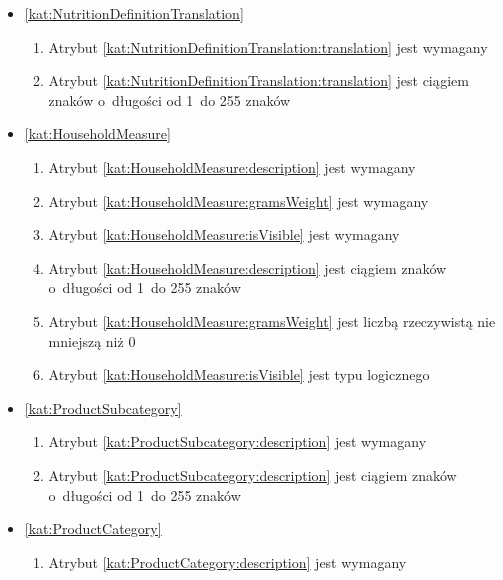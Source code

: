 \begin{itemize}[label={\textbf{Ograniczenia dla}}, wide, labelwidth=!, labelindent=0pt]
    \item\ref{kat:NutritionDefinitionTranslation}\mynobreakpar
    \begin{enumerate}[label={\textbf{OGR/2/\protect\twodigits{\arabic{enumi}}}}, wide, labelwidth=!, align=left, leftmargin=3cm, resume]
        \item Atrybut \ref{kat:NutritionDefinitionTranslation:translation} jest wymagany

        \item Atrybut \ref{kat:NutritionDefinitionTranslation:translation} jest ciągiem znaków o~długości od 1~do 255 znaków
    \end{enumerate}

    \item\ref{kat:HouseholdMeasure}\mynobreakpar
    \begin{enumerate}[label={\textbf{OGR/2/\protect\twodigits{\arabic{enumi}}}}, wide, labelwidth=!, align=left, leftmargin=3cm, resume]
        \item Atrybut \ref{kat:HouseholdMeasure:description} jest wymagany
        \item Atrybut \ref{kat:HouseholdMeasure:gramsWeight} jest wymagany
        \item Atrybut \ref{kat:HouseholdMeasure:isVisible} jest wymagany

        \item Atrybut \ref{kat:HouseholdMeasure:description} jest ciągiem znaków o~długości od 1~do 255 znaków
        \item Atrybut \ref{kat:HouseholdMeasure:gramsWeight} jest liczbą rzeczywistą nie mniejszą niż 0
        \item Atrybut \ref{kat:HouseholdMeasure:isVisible} jest typu logicznego
    \end{enumerate}

    \item\ref{kat:ProductSubcategory}\mynobreakpar
    \begin{enumerate}[label={\textbf{OGR/2/\protect\twodigits{\arabic{enumi}}}}, wide, labelwidth=!, align=left, leftmargin=3cm, resume]
        \item Atrybut \ref{kat:ProductSubcategory:description} jest wymagany

        \item Atrybut \ref{kat:ProductSubcategory:description} jest ciągiem znaków o~długości od 1~do 255 znaków
    \end{enumerate}

    \item\ref{kat:ProductCategory}\mynobreakpar
    \begin{enumerate}[label={\textbf{OGR/2/\protect\twodigits{\arabic{enumi}}}}, wide, labelwidth=!, align=left, leftmargin=3cm, resume]
        \item Atrybut \ref{kat:ProductCategory:description} jest wymagany


\end{enumerate}
\end{itemize}
